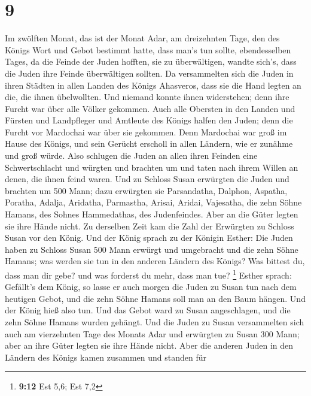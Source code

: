 \hypertarget{section-3}{%
\section{9}\label{section-3}}

 Im zwölften Monat, das ist der Monat Adar, am dreizehnten
Tage, den des Königs Wort und Gebot bestimmt hatte, dass man's tun
sollte, ebendesselben Tages, da die Feinde der Juden hofften, sie zu
überwältigen, wandte sich's, dass die Juden ihre Feinde überwältigen
sollten.  Da versammelten sich die Juden in ihren Städten
in allen Landen des Königs Ahasveros, dass sie die Hand legten an die,
die ihnen übelwollten. Und niemand konnte ihnen widerstehen; denn ihre
Furcht war über alle Völker gekommen.  Auch alle Obersten
in den Landen und Fürsten und Landpfleger und Amtleute des Königs halfen
den Juden; denn die Furcht vor Mardochai war über sie gekommen.
 Denn Mardochai war groß im Hause des Königs, und sein
Gerücht erscholl in allen Ländern, wie er zunähme und groß würde.
 Also schlugen die Juden an allen ihren Feinden eine
Schwertschlacht und würgten und brachten um und taten nach ihrem Willen
an denen, die ihnen feind waren.  Und zu Schloss Susan
erwürgten die Juden und brachten um 500 Mann;  dazu
erwürgten sie Parsandatha, Dalphon, Aspatha,  Poratha,
Adalja, Aridatha,  Parmastha, Arisai, Aridai, Vajesatha,
 die zehn Söhne Hamans, des Sohnes Hammedathas, des
Judenfeindes. Aber an die Güter legten sie ihre Hände nicht.
 Zu derselben Zeit kam die Zahl der Erwürgten zu Schloss
Susan vor den König.  Und der König sprach zu der Königin
Esther: Die Juden haben zu Schloss Susan 500 Mann erwürgt und umgebracht
und die zehn Söhne Hamans; was werden sie tun in den anderen Ländern des
Königs? Was bittest du, dass man dir gebe? und was forderst du mehr,
dass man tue? \footnote{\textbf{9:12} Est 5,6; Est 7,2} 
Esther sprach: Gefällt's dem König, so lasse er auch morgen die Juden zu
Susan tun nach dem heutigen Gebot, und die zehn Söhne Hamans soll man an
den Baum hängen.  Und der König hieß also tun. Und das
Gebot ward zu Susan angeschlagen, und die zehn Söhne Hamans wurden
gehängt.  Und die Juden zu Susan versammelten sich auch
am vierzehnten Tage des Monats Adar und erwürgten zu Susan 300 Mann;
aber an ihre Güter legten sie ihre Hände nicht.  Aber die
anderen Juden in den Ländern des Königs kamen zusammen und standen für
